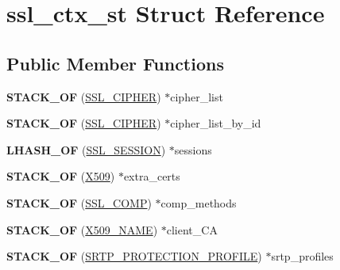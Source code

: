 \hypertarget{structssl__ctx__st}{}\section{ssl\+\_\+ctx\+\_\+st Struct Reference}
\label{structssl__ctx__st}
\subsection*{Public Member Functions}
\begin{DoxyCompactItemize}
\item 
\mbox{\label{structssl__ctx__st_a62061de7026e624a2a1356e74a44a4ca}} 
{\bfseries S\+T\+A\+C\+K\+\_\+\+OF} (\hyperlink{structssl__cipher__st}{S\+S\+L\+\_\+\+C\+I\+P\+H\+ER}) $\ast$cipher\+\_\+list
\item 
\mbox{\label{structssl__ctx__st_a32884086c2e3b6c6d01150922bae386c}} 
{\bfseries S\+T\+A\+C\+K\+\_\+\+OF} (\hyperlink{structssl__cipher__st}{S\+S\+L\+\_\+\+C\+I\+P\+H\+ER}) $\ast$cipher\+\_\+list\+\_\+by\+\_\+id
\item 
\mbox{\label{structssl__ctx__st_a53788edd2eba014536921c5ffe057936}} 
{\bfseries L\+H\+A\+S\+H\+\_\+\+OF} (\hyperlink{structssl__session__st}{S\+S\+L\+\_\+\+S\+E\+S\+S\+I\+ON}) $\ast$sessions
\item 
\mbox{\label{structssl__ctx__st_a9dce1e57755c737a3ba1718e7a8ec87a}} 
{\bfseries S\+T\+A\+C\+K\+\_\+\+OF} (\hyperlink{structx509__st}{X509}) $\ast$extra\+\_\+certs
\item 
\mbox{\label{structssl__ctx__st_a26d1f02658b67ee5eaf0153aa960fa08}} 
{\bfseries S\+T\+A\+C\+K\+\_\+\+OF} (\hyperlink{structssl__comp__st}{S\+S\+L\+\_\+\+C\+O\+MP}) $\ast$comp\+\_\+methods
\item 
\mbox{\label{structssl__ctx__st_a0b201e977f8d6f8262d9060d5a00dc09}} 
{\bfseries S\+T\+A\+C\+K\+\_\+\+OF} (\hyperlink{struct_x509__name__st}{X509\+\_\+\+N\+A\+ME}) $\ast$client\+\_\+\+CA
\item 
\mbox{\label{structssl__ctx__st_a80ae0543e14a7a480190ab64c34bb32a}} 
{\bfseries S\+T\+A\+C\+K\+\_\+\+OF} (\hyperlink{structsrtp__protection__profile__st}{S\+R\+T\+P\+\_\+\+P\+R\+O\+T\+E\+C\+T\+I\+O\+N\+\_\+\+P\+R\+O\+F\+I\+LE}) $\ast$srtp\+\_\+profiles
\end{DoxyCompactItemize}
